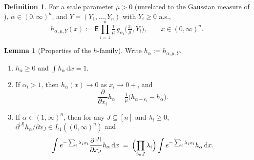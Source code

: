 \documentclass[12pt,a4paper]{article}
\theoremstyle{definition}
\newtheorem{lemma}[theorem]{Lemma}
\newtheorem{definition}[theorem]{Definition}
\newcommand{\EE}{\mathsf{E}}
\newcommand{\dd}{\mathrm{d}}
\begin{document}
\begin{definition}\label{def:h_family}
  For a scale parameter $\mu>0$ (unrelated to the Gaussian measure of
  ), $\alpha\in(0,\infty)^n$, and
  $Y=(Y_1,\ldots,Y_n)$ with $Y_i\geqslant 0$ a.s.,
  \[
    h_{\alpha,\mu,Y}(x)
    :=\EE\prod_{i=1}^n
      \tfrac{1}{\mu}\,g_{\alpha_i}\!\bigl(\tfrac{x_i}{\mu},Y_i\bigr),
    \qquad x\in(0,\infty)^n.
  \]
\end{definition}

\begin{lemma}[Properties of the $h$-family]\label{lem:proph}
  Write $h_\alpha:=h_{\alpha,\mu,Y}$.
  \begin{enumerate}[label=(\roman*)]
    \item $h_\alpha\geqslant 0$ and $\int h_\alpha\,\dd x=1$.
    \item If $\alpha_i>1$, then $h_\alpha(x)\to 0$ as $x_i\to 0+$,
      and
      \begin{equation}\label{eq:deriv_h}
        \frac{\partial}{\partial x_i}h_\alpha=\tfrac{1}{\mu}\bigl(h_{\alpha-e_i}-h_\alpha\bigr).
      \end{equation}
    \item If $\alpha\in(1,\infty)^n$, then for any $J\subseteq[n]$
      and $\lambda_i\geqslant 0$,
      $\partial^{|J|}h_\alpha/\partial x_J\in L_1((0,\infty)^n)$ and
      \begin{equation}\label{eq:proph_iii}
        \int e^{-\sum_i\lambda_ix_i}
          \frac{\partial^{|J|}}{\partial x_J}h_\alpha\,\dd x
        \;=\;
        \Bigl(\prod_{i\in J}\lambda_i\Bigr)
        \int e^{-\sum_i\lambda_ix_i}h_\alpha\,\dd x.
      \end{equation}
  \end{enumerate}
\end{lemma}
\end{document}
